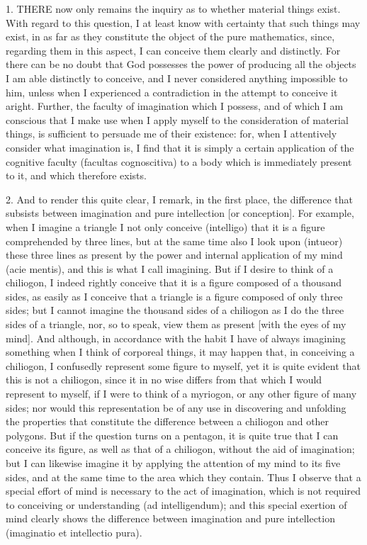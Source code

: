 1. THERE now only remains the inquiry as to whether material things exist. With regard to this question, I at least know with certainty that such things may exist, in as far as they constitute the object of the pure mathematics, since, regarding them in this aspect, I can conceive them clearly and distinctly. For there can be no doubt that God possesses the power of producing all the objects I am able distinctly to conceive, and I never considered anything impossible to him, unless when I experienced a contradiction in the attempt to conceive it aright. Further, the faculty of imagination which I possess, and of which I am conscious that I make use when I apply myself to the consideration of material things, is sufficient to persuade me of their existence: for, when I attentively consider what imagination is, I find that it is simply a certain application of the cognitive faculty (facultas cognoscitiva) to a body which is immediately present to it, and which therefore exists.

2. And to render this quite clear, I remark, in the first place, the difference that subsists between imagination and pure intellection [or conception]. For example, when I imagine a triangle I not only conceive (intelligo) that it is a figure comprehended by three lines, but at the same time also I look upon (intueor) these three lines as present by the power and internal application of my mind (acie mentis), and this is what I call imagining. But if I desire to think of a chiliogon, I indeed rightly conceive that it is a figure composed of a thousand sides, as easily as I conceive that a triangle is a figure composed of only three sides; but I cannot imagine the thousand sides of a chiliogon as I do the three sides of a triangle, nor, so to speak, view them as present [with the eyes of my mind]. And although, in accordance with the habit I have of always imagining something when I think of corporeal things, it may happen that, in conceiving a chiliogon, I confusedly represent some figure to myself, yet it is quite evident that this is not a chiliogon, since it in no wise differs from that which I would represent to myself, if I were to think of a myriogon, or any other figure of many sides; nor would this representation be of any use in discovering and unfolding the properties that constitute the difference between a chiliogon and other polygons. But if the question turns on a pentagon, it is quite true that I can conceive its figure, as well as that of a chiliogon, without the aid of imagination; but I can likewise imagine it by applying the attention of my mind to its five sides, and at the same time to the area which they contain. Thus I observe that a special effort of mind is necessary to the act of imagination, which is not required to conceiving or understanding (ad intelligendum); and this special exertion of mind clearly shows the difference between imagination and pure intellection (imaginatio et intellectio pura).

